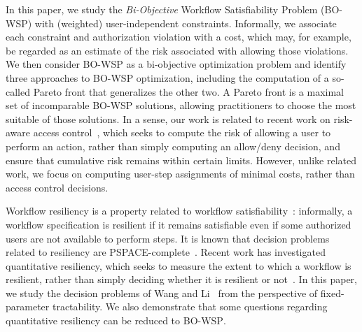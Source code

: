 \documentclass[jcs,crcready]{iosart1c}
\newcommand{\BOWSP}{\textsc{BO-WSP}\xspace}
\begin{document}
In this paper, we study the \emph{Bi-Objective} Workflow Satisfiability Problem (\BOWSP) with (weighted) user-independent constraints.
Informally, we associate each constraint and authorization violation with a cost, which may, for example, be regarded as an estimate of the risk associated with allowing those violations.
We then consider \BOWSP as a bi-objective optimization problem and identify three approaches to \BOWSP optimization, including the computation of a so-called Pareto front that generalizes the other two.
A Pareto front is a maximal set of incomparable \BOWSP solutions, allowing practitioners to choose the most suitable of those solutions. 
In a sense, our work is related to recent work on risk-aware access control~\cite{ChCr11,ChRoKeKaWaRe07,DiBeEyBaMo04,NiBeLo10}, which seeks to compute the risk of allowing a user to perform an action, rather than simply computing an allow/deny decision, and ensure that cumulative risk remains within certain limits.
However, unlike related work, we focus on computing user-step assignments of minimal costs, rather than access control decisions.

Workflow resiliency is a property related to workflow satisfiability~\cite{WaLi10}: informally, a workflow specification is resilient if it remains satisfiable even if some authorized users are not available to perform steps.
It is known that decision problems related to resiliency are PSPACE-complete~\cite[Theorems 14--15]{WaLi10}.
Recent work has investigated quantitative resiliency, which seeks to measure the extent to which a workflow is resilient, rather than simply deciding whether it is resilient or not~\cite{MaMoMo14}.
In this paper, we study the decision problems of Wang and Li~\cite{WaLi10} from the perspective of fixed-parameter tractability.
We also demonstrate that some questions regarding quantitative resiliency can be reduced to \BOWSP.
\end{document}
